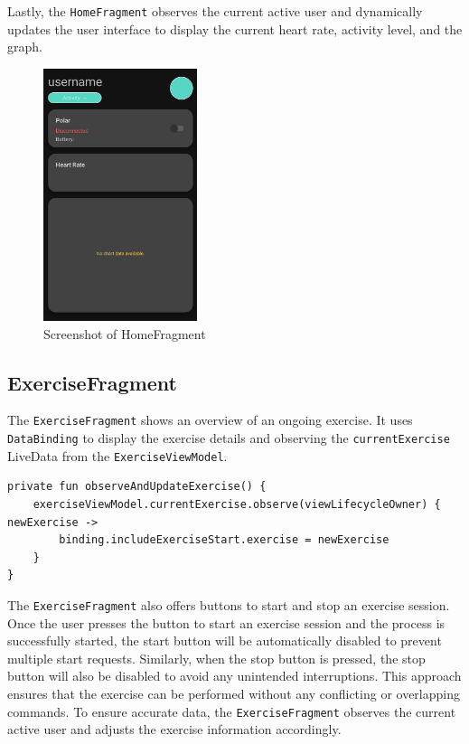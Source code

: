 Lastly, the \texttt{HomeFragment} observes the current active user and dynamically updates the user interface to display the current heart rate, activity level, and the graph.
\begin{figure}[H]
    \centering
    \includegraphics[width=0.4\textwidth]{images/homefragment-screenshot.png}
    \caption{Screenshot of HomeFragment}
    \label{fig:homefragment_screenshot}
\end{figure}

\subsection{ExerciseFragment}
The \texttt{ExerciseFragment} shows an overview of an ongoing exercise. It uses \texttt{DataBinding} to display the exercise details and observing the \texttt{currentExercise} LiveData from the \texttt{ExerciseViewModel}. 
\begin{lstlisting}[caption={Observer for currentExercise (HomeFragment)}]
private fun observeAndUpdateExercise() {
    exerciseViewModel.currentExercise.observe(viewLifecycleOwner) { newExercise ->
        binding.includeExerciseStart.exercise = newExercise
    }
}
\end{lstlisting}

The \texttt{ExerciseFragment} also offers buttons to start and stop an exercise session.
Once the user presses the button to start an exercise session and the process is successfully started, the start button will be automatically disabled to prevent multiple start requests. Similarly, when the stop button is pressed, the stop button will also be disabled to avoid any unintended interruptions. 
This approach ensures that the exercise can be performed without any conflicting or overlapping commands.
To ensure accurate data, the \texttt{ExerciseFragment} observes the current active user and adjusts the exercise information accordingly.

